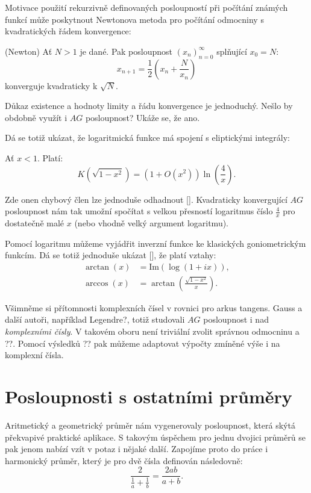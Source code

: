 \documentclass[12pt]{report}
\begin{document}
Motivace použití rekurzivně definovaných posloupností při počítání známých funkcí může poskytnout Newtonova metoda pro počítání odmocniny s kvadratických řádem konvergence:

\begin{veta}(Newton)
Ať $N>1$ je dané. Pak posloupnost $(x_n)_{n=0}^{\infty}$ splňující $x_0 = N$:
$$x_{n+1} = \frac{1}{2} \left( x_n + \frac{N}{x_n}\right)$$
konverguje kvadraticky k $\sqrt{N}$.
\end{veta}
Důkaz existence a hodnoty limity a řádu konvergence je jednoduchý. Nešlo by obdobně využít i $AG$ posloupnost? Ukáže se, že ano.

Dá se totiž ukázat, že logaritmická funkce má spojení s eliptickými integrály:
\begin{veta}
Ať $x < 1$. Platí:
$$K(\sqrt{1-x^2}) = \left(1+O(x^2)\right)\ln\left(\frac{4}{x} \right).$$
\end{veta}
Zde onen chybový člen lze jednoduše odhadnout []. Kvadraticky konvergující $AG$ posloupnost nám tak umožní spočítat s velkou přesností logaritmus číslo $\frac{4}{x}$ pro dostatečně malé $x$ (nebo vhodně velký argument logaritmu).

Pomocí logaritmu můžeme vyjádřit inverzní funkce ke klasických goniometrickým funkcím. Dá se totiž jednoduše ukázat [], že platí vztahy:
\begin{align*}
\arctan (x) &= \textrm{Im}(\log(1+ix)),\\
\arccos (x) &= \arctan\left(\frac{\sqrt{1-x^2}}{x} \right).
\end{align*}

\begin{poznamka}
Všimněme si přítomnosti komplexních čísel v rovnici pro arkus tangens. Gauss a další autoři, například Legendre?, totiž studovali $AG$ posloupnost i nad \textit{komplexními čísly}. V takovém oboru není triviální zvolit správnou odmocninu a ??. Pomocí výsledků ?? pak můžeme adaptovat výpočty zmíněné výše i na komplexní čísla. 
\end{poznamka}



\section{Posloupnosti s ostatními průměry}

Aritmetický a geometrický průměr nám vygenerovaly posloupnost, která skýtá překvapivé praktické aplikace. S takovým úspěchem pro jednu dvojici průměrů se pak jenom nabízí vzít v potaz i nějaké další. Zapojíme proto do práce i harmonický průměr, který je pro dvě čísla definován následovně:
$$\frac{2}{\frac{1}{a}+\frac{1}{b}} = \frac{2ab}{a+b}.$$
\end{document}
